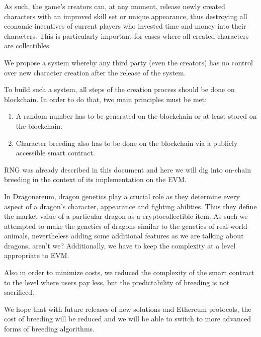 \documentclass[12pt]{article}
\begin{document}
As such, the game’s creators can, at any moment, release newly created characters with an improved skill set or unique appearance, thus destroying all economic incentives of current players who invested time and money into their characters. This is particularly important for cases where all created characters are collectibles.\par

We propose a system whereby any third party (even the creators) has no control over new character creation after the release of the system.\par

To build such a system, all steps of the creation process should be done on blockchain. In order to do that, two main principles must be met:\par

\begin{enumerate}
	\item A random number has to be generated on the blockchain or at least stored on the blockchain.\par

	\item Character breeding also has to be done on the blockchain via a publicly accessible smart contract.
\end{enumerate}\par

RNG was already described in this document and here we will dig into on-chain breeding in the context of its implementation on the EVM.\par

In Dragonereum, dragon genetics play a crucial role as they determine every aspect of a dragon’s character, appearance and fighting abilities. Thus they define the market value of a particular dragon as a cryptocollectible item. As such we attempted to make the genetics of dragons similar to the genetics of real-world animals, nevertheless adding some additional features as we are talking about dragons, aren’t we? Additionally, we have to keep the complexity at a level appropriate to EVM.\par

Also in order to minimize costs, we reduced the complexity of the smart contract to the level where users pay less, but the predictability of breeding is not sacrificed.\par

We hope that with future releases of new solutions and Ethereum protocols, the cost of breeding will be reduced and we will be able to switch to more advanced forms of breeding algorithms.\par
\end{document}
